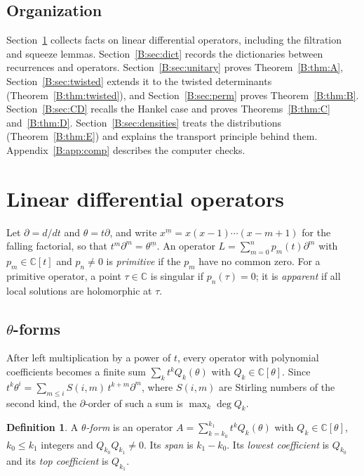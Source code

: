 \documentclass[11pt,a4paper]{article}
\theoremstyle{definition}
\newtheorem{definition}[theorem]{Definition}
\theoremstyle{remark}
\newcommand{\C}{\mathbb C}
\newcommand{\ff}[2]{#1^{\underline{#2}}}
\numberwithin{equation}{section}
\begin{document}
\subsection*{Organization}
Section~\ref{B:sec:ops} collects facts on linear differential operators, including the filtration and squeeze lemmas. Section~\ref{B:sec:dict} records the dictionaries between recurrences and operators. Section~\ref{B:sec:unitary} proves Theorem~\ref{B:thm:A}, Section~\ref{B:sec:twisted} extends it to the twisted determinants (Theorem~\ref{B:thm:twisted}), and Section~\ref{B:sec:perm} proves Theorem~\ref{B:thm:B}. Section~\ref{B:sec:CD} recalls the Hankel case and proves Theorems~\ref{B:thm:C} and~\ref{B:thm:D}. Section~\ref{B:sec:densities} treats the distributions (Theorem~\ref{B:thm:E}) and explains the transport principle behind them. Appendix~\ref{B:app:comp} describes the computer checks.

\section{Linear differential operators}\label{B:sec:ops}

Let $\partial=d/dt$ and $\theta=t\partial$, and write $\ff{x}{m}=x(x-1)\cdots(x-m+1)$ for the falling factorial, so that $t^m\partial^m=\ff{\theta}{m}$. An operator $L=\sum_{m=0}^np_m(t)\partial^m$ with $p_m\in\C[t]$ and $p_n\ne0$ is \emph{primitive} if the $p_m$ have no common zero. For a primitive operator, a point $\tau\in\C$ is singular if $p_n(\tau)=0$; it is \emph{apparent} if all local solutions are holomorphic at $\tau$.

\subsection{\texorpdfstring{$\theta$}{theta}-forms}
After left multiplication by a power of $t$, every operator with polynomial coefficients becomes a finite sum $\sum_k t^kQ_k(\theta)$ with $Q_k\in\C[\theta]$. Since $t^k\theta^i=\sum_{m\le i}S(i,m)\,t^{k+m}\partial^m$, where $S(i,m)$ are Stirling numbers of the second kind, the $\partial$-order of such a sum is $\max_k\deg Q_k$.

\begin{definition}
A \emph{$\theta$-form} is an operator $A=\sum_{k=k_0}^{k_1}t^kQ_k(\theta)$ with $Q_k\in\C[\theta]$, $k_0\le k_1$ integers and $Q_{k_0}Q_{k_1}\ne0$. Its \emph{span} is $k_1-k_0$. Its \emph{lowest coefficient} is $Q_{k_0}$ and its \emph{top coefficient} is $Q_{k_1}$.
\end{definition}
\end{document}
